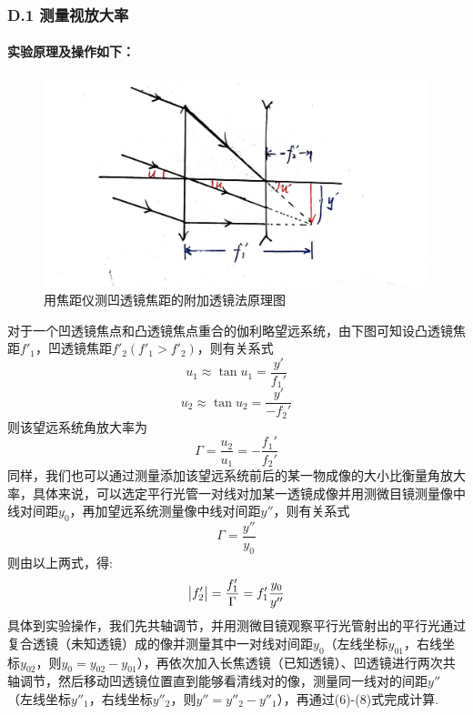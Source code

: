 \documentclass[UTF8]{ctexart}
\begin{document}
\subsubsection*{D.1 测量视放大率}

\paragraph{实验原理及操作如下：}\quad\par
\begin{figure}[H]
    \begin{center}
    \includegraphics[scale=0.15]{2.jpg}\vspace{0em}
    \caption{用焦距仪测凹透镜焦距的附加透镜法原理图}
    \end{center}
\end{figure}
对于一个凹透镜焦点和凸透镜焦点重合的伽利略望远系统，由下图可知设凸透镜焦距$f'_1$，凹透镜焦距$f'_2$$(f'_1>f'_2)$，则有关系式
\[u_1\approx\tan u_1=\frac{y'}{f_1'}\]
\[u_2\approx\tan u_2=\frac{y'}{-f_2'}\]
则该望远系统角放大率为
\begin{equation}
    \Gamma=\frac{u_2}{u_1}=-\frac{f_1'}{f_2'}
\end{equation}
同样，我们也可以通过测量添加该望远系统前后的某一物成像的大小比衡量角放大率，具体来说，可以选定平行光管一对线对加某一透镜成像并用测微目镜测量像中线对间距$y_0$，再加望远系统测量像中线对间距$y''$，则有关系式
\begin{equation}
    \Gamma=\frac{y''}{y_0}
\end{equation}
则由以上两式，得:
\begin{equation}
    \big{|}f_2'\big{|}=\frac{f_1'}{\Gamma}={f_1'}\frac{y_0}{y''}
\end{equation}
具体到实验操作，我们先共轴调节，并用测微目镜观察平行光管射出的平行光通过复合透镜（未知透镜）成的像并测量其中一对线对间距$y_0$（左线坐标$y_{01}$，右线坐标$y_{02}$，则$y_0=y_{02}-y_{01}$），再依次加入长焦透镜（已知透镜）、凹透镜进行两次共轴调节，然后移动凹透镜位置直到能够看清线对的像，测量同一线对的间距$y''$（左线坐标$y''_{1}$，右线坐标$y''_{2}$，则$y''=y''_{2}-y''_{1}$），再通过(6)-(8)式完成计算.\par
\end{document}
